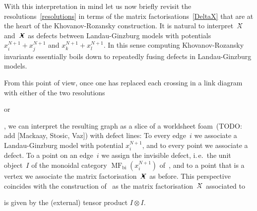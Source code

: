 \documentclass{compositio}
\theoremstyle{definition}
\numberwithin{equation}{section}
\begin{document}
With this interpretation in mind let us now briefly revisit the resolutions~\eqref{resolutions} in terms of the matrix factorisations~\eqref{DeltaX} that are at the heart of the Khovanov-Rozansky construction. It is natural to interpret~$\Xcirc$ and~$\Xbul$ as defects between Landau-Ginzburg models with potentials $x^{N+1}_{i}+x^{N+1}_{j}$ and $x^{N+1}_{k}+x^{N+1}_{l}$. In this sense computing Khovanov-Rozansky invariants essentially boils down to repeatedly fusing defects in Landau-Ginzburg models. 

From this point of view, once one has replaced each crossing in a link diagram with either of the two resolutions 
\begin{minipage}{0.36cm}
\end{minipage}
 or 
 \begin{minipage}{0.36cm}
\end{minipage}
, we can interpret the resulting graph as a slice of a worldsheet foam~\cite{kr0404189}(TODO: add [Mackaay, Stosic, Vaz]) with defect lines: To every edge~$i$ we associate a Landau-Ginzburg model with potential $x_{i}^{N+1}$, and to every point we associate a defect. To a point on an edge~$i$ we assign the invisible defect, i.\,e.~the unit object~$I$ of the monoidal category $\operatorname{MF}_{\text{bi}}(x_{i}^{N+1})$ of~\cite{cr0909.4381}, and to a point that is a vertex we associate the matrix factorisation~$\Xbul$ as before. This perspective coincides with the construction of~\cite{kr0401268} as the matrix factorisation~$\Xcirc$ associated to 
\begin{minipage}{0.3cm}
\end{minipage}
 is given by the (external) tensor product $I\otimes I$. 
\end{document}
